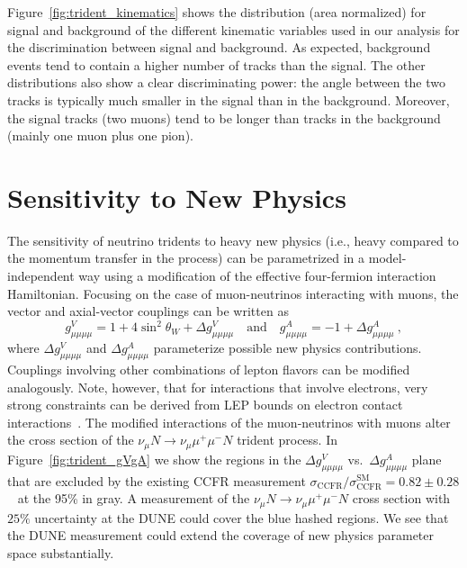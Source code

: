 Figure~\ref{fig:trident_kinematics} shows the distribution (area normalized) for signal and background of the different kinematic variables used in our analysis for the discrimination between signal and background. As expected, background events tend to contain a higher number of tracks than the signal. The other distributions also show a clear discriminating power: the angle between the two tracks is typically much smaller in the signal than in the background. Moreover, the signal tracks (two muons) tend to be longer than tracks in the background (mainly one muon plus one pion).

\section{Sensitivity to New Physics} %

The sensitivity of neutrino tridents to heavy new physics (i.e., heavy compared to the momentum transfer in the process) can be parametrized in a model-independent way using a modification of the effective four-fermion interaction Hamiltonian. Focusing on the case of muon-neutrinos interacting with muons, the vector and axial-vector couplings can be written as
\begin{equation}
g_{\mu\mu\mu\mu}^V = 1 + 4 \sin^2\theta_W + \Delta g_{\mu\mu\mu\mu}^V \quad \mathrm{and} \quad g_{\mu\mu\mu\mu}^A = -1 + \Delta g_{\mu\mu\mu\mu}^A ~,
\end{equation}
where $\Delta g_{\mu\mu\mu\mu}^V$ and $\Delta g_{\mu\mu\mu\mu}^A$ parameterize possible new physics contributions. Couplings involving other combinations of lepton flavors can be modified analogously. Note, however, that for interactions that involve electrons, very strong constraints can be derived from LEP bounds on electron contact interactions~\cite{Schael:2013ita}. The modified interactions of the muon-neutrinos with muons alter the cross section of the $\nu_\mu N \to \nu_\mu \mu^+\mu^- N$ trident process. In Figure~\ref{fig:trident_gVgA} we show the regions in the $\Delta g^V_{\mu\mu\mu\mu}$ vs.\ $\Delta g^A_{\mu\mu\mu\mu}$ plane that are excluded by the existing CCFR measurement $\sigma_\text{CCFR} / \sigma_\text{CCFR}^\text{SM} = 0.82 \pm 0.28$~\cite{Mishra:1991bv} at the 95\%  in gray. A measurement of the $\nu_\mu N \to \nu_\mu \mu^+\mu^- N$ cross section with $25\%$ uncertainty at the DUNE   could cover the blue hashed regions. We see that the DUNE measurement could extend the coverage of new physics parameter space substantially.

